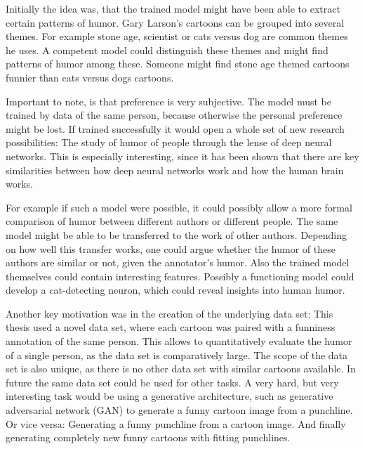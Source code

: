 \documentclass[draft,final,oneside]{vutinfth} %
\begin{document}
Initially the idea was, that the trained model might have been able to extract certain patterns of humor. Gary Larson's cartoons can be grouped into several themes. For example stone age, scientist or cats versus dog are common themes he uses. A competent model could distinguish these themes and might find patterns of humor among these. Someone might find stone age themed cartoons funnier than cats versus dogs cartoons. 

Important to note, is that preference is very subjective. The model must be trained by data of the same person, because otherwise the personal preference might be lost. If trained successfully it would open a whole set of new research possibilities: The study of humor of people through the lense of deep neural networks. This is especially interesting, since it has been shown that there are key similarities between how deep neural networks work and how the human brain works. \cite{Cichy2016}

For example if such a model were possible, it could possibly allow a more formal comparison of humor between different authors or different people.
The same model might be able to be transferred to the work of other authors. Depending on how well this transfer works, one could argue whether the humor of these authors are similar or not, given the annotator's humor. Also the trained model themselves could contain interesting features. Possibly a functioning model could develop a cat-detecting neuron, which could reveal insights into human humor.

Another key motivation was in the creation of the underlying data set: This thesis used a novel data set, where each cartoon was paired with a funniness annotation of the same person. This allows to quantitatively evaluate the humor of a single person, as the data set is comparatively large. The scope of the data set is also unique, as there is no other data set with similar cartoons available. In future the same data set could be used for other tasks. A very hard, but very interesting task would be using a generative architecture, such as generative adversarial network (GAN) to generate a funny cartoon image from a punchline. Or vice versa: Generating a funny punchline from a cartoon image. And finally generating completely new funny cartoons with fitting punchlines.\cite{gan2}\cite{gan}
\end{document}
